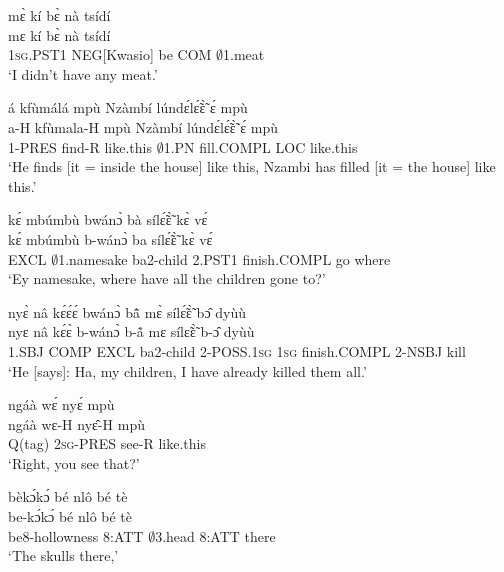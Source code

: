 \begin{exe} 
\exN\label{128}
  \glll mɛ̀ kí bɛ̀ nà tsídí \\
       mɛ kí bɛ̀ nà tsídí \\
       1\textsc{sg}.PST1 NEG[Kwasio] be COM $\emptyset$1.meat  \\
    \trans `I didn't have any meat.'
\end{exe}

\begin{exe} 
\exN\label{129}
  \glll á kfùmálá mpù Nzàmbí lúndɛ́lɛ̃́ɛ̃̀ ɛ́ mpù \\
        a-H kfùmala-H mpù Nzàmbí lúndɛ́lɛ̃́ɛ̃̀ ɛ́ mpù \\
        1-PRES find-R like.this $\emptyset$1.PN fill.COMPL LOC like.this \\
    \trans `He finds [it = inside the house] like this, Nzambi has filled [it = the house] like this.'
\end{exe}

\begin{exe} 
\exN\label{130}
  \glll kɛ́ mbúmbù bwánɔ̀ bà sílɛ̃́ɛ̃̀ kɛ̀ vɛ́ \\
       kɛ́ mbúmbù b-wánɔ̀ ba sílɛ̃́ɛ̃̀ kɛ̀ vɛ́ \\
        EXCL $\emptyset$1.namesake ba2-child 2.PST1 finish.COMPL go where \\
    \trans `Ey namesake, where have all the children gone to?'
\end{exe}

\begin{exe} 
\exN\label{131}
  \glll  nyɛ̀ nâ kɛ́ɛ́ɛ́ bwánɔ̀ bã̂ mɛ̀ sílɛ̃́ɛ̃̀ bɔ̂ dyùù\\
        nyɛ nâ kɛ́ɛ̀ b-wánɔ̀ b-ã̊ mɛ sílɛ̃ɛ̃̀ b-ɔ̂ dyùù\\
        1.SBJ COMP EXCL ba2-child 2-POSS.1\textsc{sg} 1\textsc{sg} finish.COMPL 2-NSBJ kill\\
    \trans `He [says]: Ha, my children, I have already killed them all.'
\end{exe}

\begin{exe} 
\exN\label{132}
  \glll ngáà wɛ́ nyɛ́ mpù \\
       ngáà wɛ-H nyɛ̂-H mpù \\
       Q(tag) 2\textsc{sg}-PRES see-R like.this  \\
    \trans `Right, you see that?'
\end{exe}

\begin{exe} 
\exN\label{133}
  \glll bèkɔ́kɔ́ bé nlô bé tè \\
       be-kɔ́kɔ́ bé nlô bé tè \\
        be8-hollowness 8:ATT $\emptyset$3.head 8:ATT there \\
    \trans `The skulls there,'
\end{exe}

